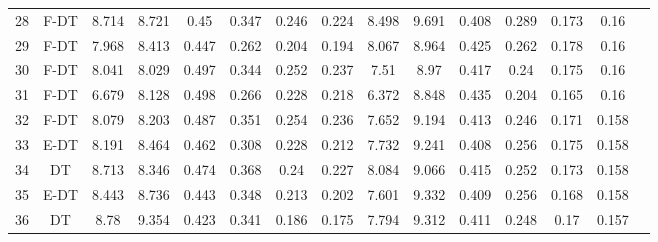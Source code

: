 \begin{longtable}{@{\hskip3pt}c@{\hskip3pt}c@{\hskip3pt}c@{\hskip3pt}c@{\hskip3pt}c@{\hskip3pt}c@{\hskip3pt}c@{\hskip3pt}c@{\hskip3pt}c@{\hskip3pt}c@{\hskip3pt}c@{\hskip3pt}c@{\hskip3pt}c@{\hskip3pt}c@{\hskip3pt}c}
         28 &           F-DT &             8.714 &          8.721 &            0.45 &           0.347 &           0.246 &           0.224 &               8.498 &           9.691 &           0.408 &         0.289 &          0.173 &            0.16 \\
         29 &           F-DT &             7.968 &          8.413 &           0.447 &           0.262 &           0.204 &           0.194 &               8.067 &           8.964 &           0.425 &         0.262 &          0.178 &            0.16 \\
         30 &           F-DT &             8.041 &          8.029 &           0.497 &           0.344 &           0.252 &           0.237 &                7.51 &            8.97 &           0.417 &          0.24 &          0.175 &            0.16 \\
         31 &           F-DT &             6.679 &          8.128 &           0.498 &           0.266 &           0.228 &           0.218 &               6.372 &           8.848 &           0.435 &         0.204 &          0.165 &            0.16 \\
         32 &           F-DT &             8.079 &          8.203 &           0.487 &           0.351 &           0.254 &           0.236 &               7.652 &           9.194 &           0.413 &         0.246 &          0.171 &           0.158 \\
         33 &           E-DT &             8.191 &          8.464 &           0.462 &           0.308 &           0.228 &           0.212 &               7.732 &           9.241 &           0.408 &         0.256 &          0.175 &           0.158 \\
         34 &             DT &             8.713 &          8.346 &           0.474 &           0.368 &            0.24 &           0.227 &               8.084 &           9.066 &           0.415 &         0.252 &          0.173 &           0.158 \\
         35 &           E-DT &             8.443 &          8.736 &           0.443 &           0.348 &           0.213 &           0.202 &               7.601 &           9.332 &           0.409 &         0.256 &          0.168 &           0.158 \\
         36 &             DT &              8.78 &          9.354 &           0.423 &           0.341 &           0.186 &           0.175 &               7.794 &           9.312 &           0.411 &         0.248 &           0.17 &           0.157 \\

\end{longtable}
